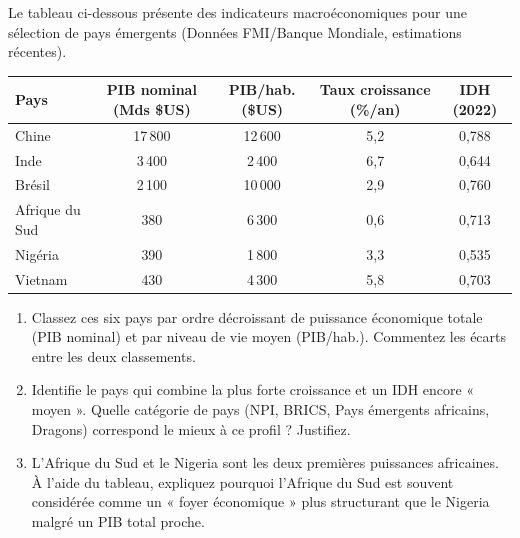 \documentclass[11pt]{article}
\begin{document}
\begin{exercice}
Le tableau ci-dessous présente des indicateurs macroéconomiques pour une sélection de pays émergents (Données FMI/Banque Mondiale, estimations récentes).

\begin{center}
\begin{tabular}{lcccc}
\toprule
Pays & PIB nominal (Mds \$US) & PIB/hab. (\$US) & Taux croissance (\%/an) & IDH (2022) \\
\midrule
Chine & 17\,800 & 12\,600 & 5,2 & 0,788 \\
Inde & 3\,400 & 2\,400 & 6,7 & 0,644 \\
Brésil & 2\,100 & 10\,000 & 2,9 & 0,760 \\
Afrique du Sud & 380 & 6\,300 & 0,6 & 0,713 \\
Nigéria & 390 & 1\,800 & 3,3 & 0,535 \\
Vietnam & 430 & 4\,300 & 5,8 & 0,703 \\
\bottomrule
\end{tabular}
\end{center}

\begin{enumerate}
    \item Classez ces six pays par ordre décroissant de puissance économique totale (PIB nominal) et par niveau de vie moyen (PIB/hab.). Commentez les écarts entre les deux classements.
    \item Identifie le pays qui combine la plus forte croissance et un IDH encore « moyen ». Quelle catégorie de pays (NPI, BRICS, Pays émergents africains, Dragons) correspond le mieux à ce profil ? Justifiez.
    \item L'Afrique du Sud et le Nigeria sont les deux premières puissances africaines. À l'aide du tableau, expliquez pourquoi l'Afrique du Sud est souvent considérée comme un « foyer économique » plus structurant que le Nigeria malgré un PIB total proche.
\end{enumerate}
\end{exercice}
\end{document}

